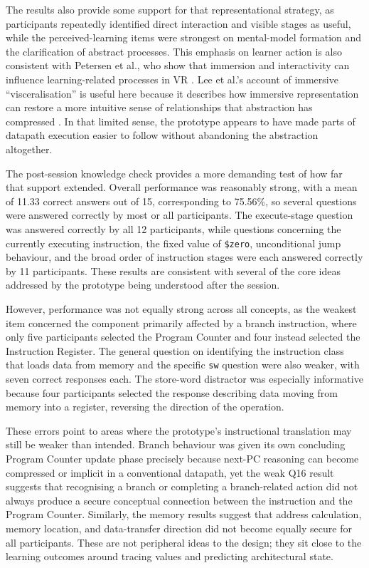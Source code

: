 The results also provide some support for that representational strategy, as participants repeatedly identified direct interaction and visible stages as useful, while the perceived-learning items were strongest on mental-model formation and the clarification of abstract processes. This emphasis on learner action is also consistent with Petersen et al., who show that immersion and interactivity can influence learning-related processes in VR \cite{petersen2022study}. Lee et al.'s account of immersive ``visceralisation'' is useful here because it describes how immersive representation can restore a more intuitive sense of relationships that abstraction has compressed \cite{lee2020data}. In that limited sense, the prototype appears to have made parts of datapath execution easier to follow without abandoning the abstraction altogether.

The post-session knowledge check provides a more demanding test of how far that support extended. Overall performance was reasonably strong, with a mean of 11.33 correct answers out of 15, corresponding to 75.56\%, so several questions were answered correctly by most or all participants. The execute-stage question was answered correctly by all 12 participants, while questions concerning the currently executing instruction, the fixed value of \texttt{\$zero}, unconditional jump behaviour, and the broad order of instruction stages were each answered correctly by 11 participants. These results are consistent with several of the core ideas addressed by the prototype being understood after the session.

However, performance was not equally strong across all concepts, as the weakest item concerned the component primarily affected by a branch instruction, where only five participants selected the Program Counter and four instead selected the Instruction Register. The general question on identifying the instruction class that loads data from memory and the specific \texttt{sw} question were also weaker, with seven correct responses each. The store-word distractor was especially informative because four participants selected the response describing data moving from memory into a register, reversing the direction of the operation.

These errors point to areas where the prototype's instructional translation may still be weaker than intended. Branch behaviour was given its own concluding Program Counter update phase precisely because next-PC reasoning can become compressed or implicit in a conventional datapath, yet the weak Q16 result suggests that recognising a branch or completing a branch-related action did not always produce a secure conceptual connection between the instruction and the Program Counter. Similarly, the memory results suggest that address calculation, memory location, and data-transfer direction did not become equally secure for all participants. These are not peripheral ideas to the design; they sit close to the learning outcomes around tracing values and predicting architectural state.

